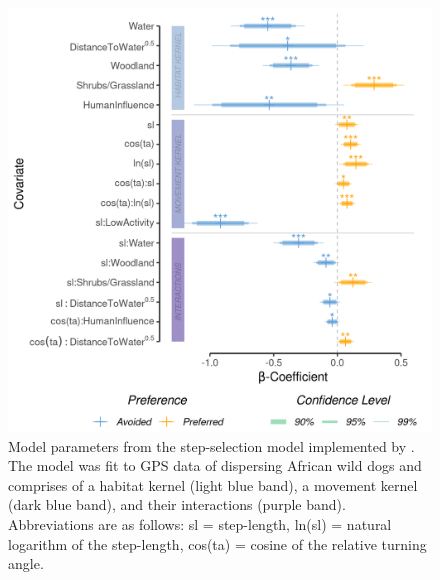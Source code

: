 \documentclass[abstract=on,10pt,a4paper,bibliography=totocnumbered]{article}
\begin{document}
\begin{figure}[htbp]
  \begin{center}
  \includegraphics[width = \textwidth]{Figures/MovementModel.png}
  \caption{Model parameters from the step-selection model implemented by
  \citet{Hofmann.2023}. The model was fit to GPS data of dispersing African wild
  dogs and comprises of a habitat kernel (light blue band), a movement kernel
  (dark blue band), and their interactions (purple band). Abbreviations are as
  follows: sl = step-length, ln(sl) = natural logarithm of the step-length,
  cos(ta) = cosine of the relative turning angle.}
  \label{Model}
  \end{center}
\end{figure}

\newpage
\end{document}
